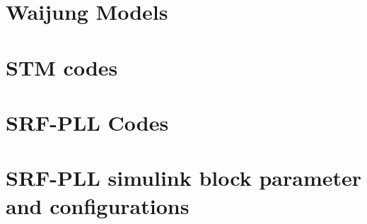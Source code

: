 \documentclass[a4paper,12pt]{iitmdiss}
\begin{document}
\begin{appendices}

\appendix

\chapter{Waijung Models}
\label{Models created using Waijung Library}


\chapter{STM codes}
\label{STM Demo Codes}


\chapter{SRF-PLL Codes}
\label{SRF-PLL Codes}


\chapter{SRF-PLL simulink block parameter and configurations}
\label{SRF-PLL simulink block parameter and configurations}




\end{appendices}

\clearpage


\clearpage 
\end{document}
